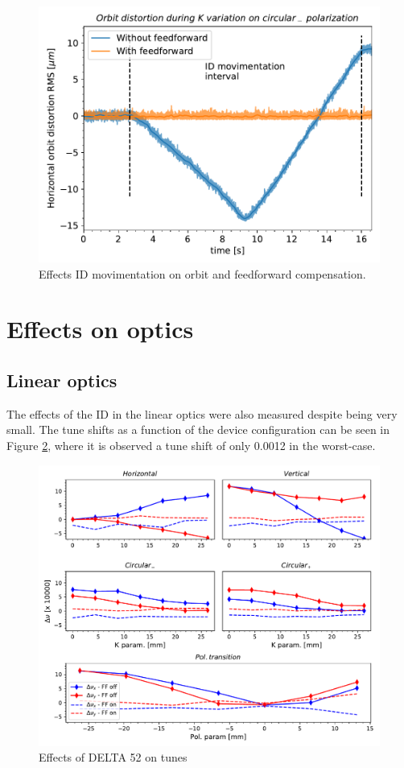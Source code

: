 \documentclass[a4paper,
               keeplastbox,   %
               ]{jacow}
\begin{document}
\begin{figure}[!h]
    \centering
   \includegraphics[width=0.75\columnwidth]{THPS18_f4.pdf}
   \caption{Effects ID movimentation on orbit and feedforward compensation.}
   \label{fig:orbit_fast}
\end{figure}

\section{Effects on optics}
\subsection{Linear optics}

The effects of the ID in the linear optics were also measured despite being very small. The tune shifts as a function of the device configuration can be seen in Figure \ref{fig:tunes}, where it is observed a tune shift of only 0.0012 in the worst-case.

\begin{figure}[!h]
    \centering
   \includegraphics[width=\columnwidth]{Tune_deviation.pdf}
   \caption{Effects of DELTA 52 on tunes}
   \label{fig:tunes}
\end{figure}
\end{document}
